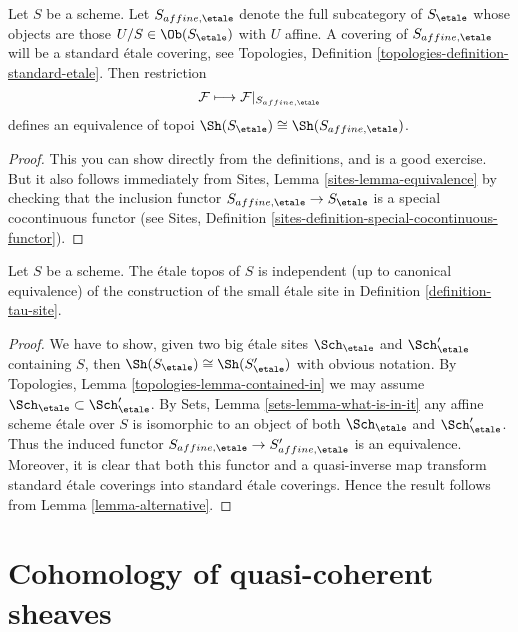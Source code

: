 \begin{lemma}
\label{lemma-alternative}
Let $S$ be a scheme. Let $S_{affine, \etale}$ denote the
full subcategory of $S_\etale$
whose objects are those $U/S \in \Ob(S_\etale)$ with
$U$ affine. A covering of $S_{affine, \etale}$ will be a standard
\'etale covering, see
Topologies, Definition \ref{topologies-definition-standard-etale}.
Then restriction
$$
\mathcal{F} \longmapsto \mathcal{F}|_{S_{affine, \etale}}
$$
defines an equivalence of topoi
$\Sh(S_\etale) \cong \Sh(S_{affine, \etale})$.
\end{lemma}

\begin{proof}
This you can show directly from the definitions, and is a good exercise.
But it also follows immediately from
Sites, Lemma \ref{sites-lemma-equivalence}
by checking that the inclusion functor
$S_{affine, \etale} \to S_\etale$
is a special cocontinuous functor (see
Sites, Definition \ref{sites-definition-special-cocontinuous-functor}).
\end{proof}

\begin{lemma}
\label{lemma-etale-topos-independent-partial-universe}
Let $S$ be a scheme. The \'etale topos of $S$ is independent
(up to canonical equivalence) of the construction of the small
\'etale site in Definition \ref{definition-tau-site}.
\end{lemma}

\begin{proof}
We have to show, given two big \'etale sites
$\Sch_\etale$ and $\Sch_\etale'$ containing
$S$, then $\Sh(S_\etale) \cong \Sh(S_\etale')$
with obvious notation. By Topologies, Lemma \ref{topologies-lemma-contained-in}
we may assume $\Sch_\etale \subset \Sch_\etale'$.
By Sets, Lemma \ref{sets-lemma-what-is-in-it}
any affine scheme \'etale over $S$ is isomorphic to an object
of both $\Sch_\etale$ and $\Sch_\etale'$.
Thus the induced functor
$S_{affine, \etale} \to S_{affine, \etale}'$
is an equivalence. Moreover, it is clear that both this functor
and a quasi-inverse map transform standard \'etale coverings into
standard \'etale coverings.
Hence the result follows from Lemma \ref{lemma-alternative}.
\end{proof}





\section{Cohomology of quasi-coherent sheaves}
\label{section-cohomology-quasi-coherent}

